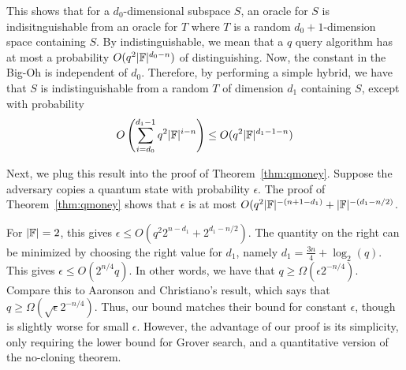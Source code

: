 This shows that for a $d_0$-dimensional subspace $S$, an oracle for $S$ is indisitnguishable from an oracle for $T$ where $T$ is a random $d_0+1$-dimension space containing $S$.  By indistinguishable, we mean that a $q$ query algorithm has at most a probability $O(q^2 |{\mathbb F}|^{d_0-n})$ of distinguishing.  Now, the constant in the Big-Oh is independent of $d_0$.  Therefore, by performing a simple hybrid, we have that $S$ is indistinguishable from a random $T$ of dimension $d_1$ containing $S$, except with probability \[O\left(\sum_{i=d_0}^{d_1-1}q^2 |{\mathbb F}|^{i-n}\right)\leq O(q^2 |{\mathbb F}|^{d_1-1-n})\]

Next, we plug this result into the proof of Theorem~\ref{thm:qmoney}.  Suppose the adversary copies a quantum state with probability $\epsilon$.  The proof of Theorem~\ref{thm:qmoney} shows that $\epsilon$ is at most $O(q^2|{\mathbb F}|^{-(n+1-d_1)}+|{\mathbb F}|^{-(d_1-n/2)}$.  
	
For $|{\mathbb F}|=2$, this gives $\epsilon\leq O(q^2 2^{n-d_1}+2^{d_1-n/2})$.  The quantity on the right can be minimized by choosing the right value for $d_1$, namely $d_1=\frac{3n}{4}+\log_2(q)$.  This gives $\epsilon\leq O(2^{n/4}q)$.  In other words, we have that $q\geq \Omega(\epsilon 2^{-n/4})$.  Compare this to Aaronson and Christiano's result, which says that $q\geq \Omega(\sqrt{\epsilon}2^{-n/4})$.  
 Thus, our bound matches their bound for constant $\epsilon$, though is slightly worse for small $\epsilon$.  However, the advantage of our proof is its simplicity, only requiring the lower bound for Grover search, and a quantitative version of the no-cloning theorem.


